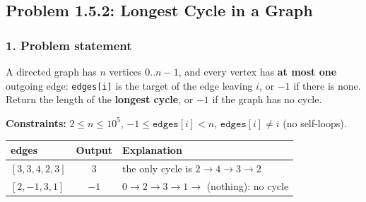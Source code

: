 \subsection{Problem 1.5.2: Longest Cycle in a Graph}


\subsubsection*{1. Problem statement}

A directed graph has $n$ vertices $0..n-1$, and every vertex has \textbf{at most one} outgoing edge: \texttt{edges[i]} is the target of the edge leaving $i$, or $-1$ if there is none. Return the length of the \textbf{longest cycle}, or $-1$ if the graph has no cycle.

\textbf{Constraints:} $2 \le n \le 10^5$, \; $-1 \le \texttt{edges}[i] < n$, \; $\texttt{edges}[i] \ne i$ (no self-loops).

\begin{table}[H]
\centering\small
\begin{tabular}{@{}lcl@{}}
\toprule
\textbf{edges} & \textbf{Output} & \textbf{Explanation} \\
\midrule
$[3,3,4,2,3]$ & 3 & the only cycle is $2 \to 4 \to 3 \to 2$ \\
$[2,-1,3,1]$ & $-1$ & $0 \to 2 \to 3 \to 1 \to$ (nothing): no cycle \\
\bottomrule
\end{tabular}
\end{table}

